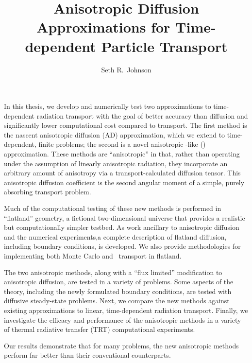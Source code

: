\documentclass{umthesis}
\author{Seth R.~Johnson}
\title{Anisotropic Diffusion Approximations for Time-dependent Particle
Transport}
\begin{document}
\begin{finalabstract}

In this thesis, we develop and numerically test two approximations to
time-dependent radiation transport with the goal of better accuracy than
diffusion and significantly lower computational cost compared to
transport. The first method is the nascent anisotropic diffusion (AD)
approximation, which we extend to time-dependent, finite problems; the
second is a novel anisotropic \Pone-like (\APone) approximation. These methods
are ``anisotropic'' in that, rather than operating under the assumption of
linearly anisotropic radiation, they incorporate an arbitrary amount of
anisotropy via a transport-calculated diffusion tensor. This anisotropic
diffusion coefficient is the second angular moment of a simple, purely
absorbing transport problem.

Much of the computational testing of these new methods is performed in
``flatland'' geometry, a fictional two-dimensional universe that provides a
realistic but computationally simpler testbed. As work ancillary to anisotropic
diffusion and the numerical experiments,a complete description
of flatland diffusion, including boundary conditions, is developed. We also
provide methodologies for implementing both Monte Carlo and \SN\ transport in
flatland.

The two anisotropic methods, along with a ``flux limited'' modification to
anisotropic diffusion, are tested in a variety of problems. Some aspects of the
theory, including the newly formulated boundary conditions, are tested with
diffusive steady-state problems. Next, we compare the new methods against
existing approximations to linear, time-dependent radiation transport. Finally,
we
investigate the efficacy and performance of the anisotropic methods in a variety
of thermal radiative transfer (TRT) computational experiments.

Our results demonstrate that for many problems, the new anisotropic
methods perform far better than their conventional counterparts.
\end{finalabstract}

\end{document}
